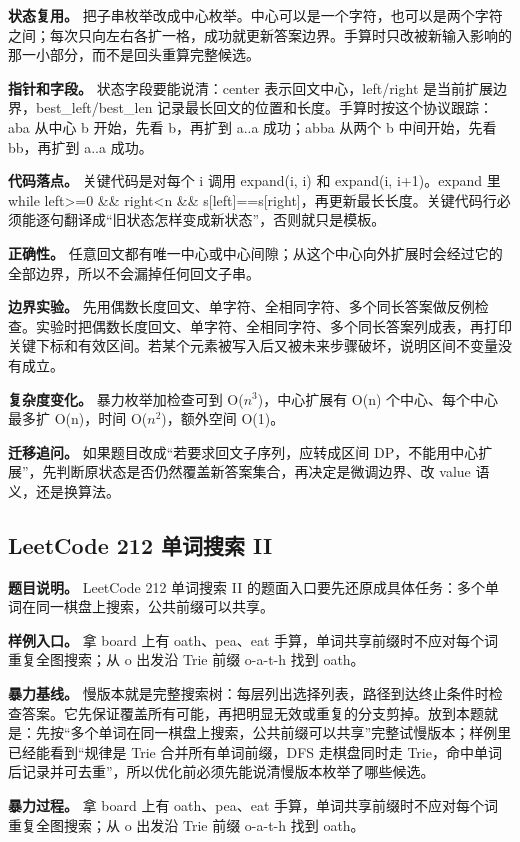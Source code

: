 \textbf{状态复用。} 把子串枚举改成中心枚举。中心可以是一个字符，也可以是两个字符之间；每次只向左右各扩一格，成功就更新答案边界。手算时只改被新输入影响的那一小部分，而不是回头重算完整候选。

\textbf{指针和字段。} 状态字段要能说清：center 表示回文中心，left/right 是当前扩展边界，best\_left/best\_len 记录最长回文的位置和长度。手算时按这个协议跟踪：aba 从中心 b 开始，先看 b，再扩到 a..a 成功；abba 从两个 b 中间开始，先看 bb，再扩到 a..a 成功。

\textbf{代码落点。} 关键代码是对每个 i 调用 expand(i, i) 和 expand(i, i+1)。expand 里 while left>=0 \&\& right<n \&\& s[left]==s[right]，再更新最长长度。关键代码行必须能逐句翻译成“旧状态怎样变成新状态”，否则就只是模板。

\textbf{正确性。} 任意回文都有唯一中心或中心间隙；从这个中心向外扩展时会经过它的全部边界，所以不会漏掉任何回文子串。

\textbf{边界实验。} 先用偶数长度回文、单字符、全相同字符、多个同长答案做反例检查。实验时把偶数长度回文、单字符、全相同字符、多个同长答案列成表，再打印关键下标和有效区间。若某个元素被写入后又被未来步骤破坏，说明区间不变量没有成立。

\textbf{复杂度变化。} 暴力枚举加检查可到 O(\ensuremath{n^{3}})，中心扩展有 O(n) 个中心、每个中心最多扩 O(n)，时间 O(\ensuremath{n^{2}})，额外空间 O(1)。

\textbf{迁移追问。} 如果题目改成“若要求回文子序列，应转成区间 DP，不能用中心扩展”，先判断原状态是否仍然覆盖新答案集合，再决定是微调边界、改 value 语义，还是换算法。

\subsection{LeetCode 212 单词搜索 II}

\textbf{题目说明。} LeetCode 212 单词搜索 II 的题面入口要先还原成具体任务：多个单词在同一棋盘上搜索，公共前缀可以共享。

\textbf{样例入口。} 拿 board 上有 oath、pea、eat 手算，单词共享前缀时不应对每个词重复全图搜索；从 o 出发沿 Trie 前缀 o-a-t-h 找到 oath。

\textbf{暴力基线。} 慢版本就是完整搜索树：每层列出选择列表，路径到达终止条件时检查答案。它先保证覆盖所有可能，再把明显无效或重复的分支剪掉。放到本题就是：先按“多个单词在同一棋盘上搜索，公共前缀可以共享”完整试慢版本；样例里已经能看到“规律是 Trie 合并所有单词前缀，DFS 走棋盘同时走 Trie，命中单词后记录并可去重”，所以优化前必须先能说清慢版本枚举了哪些候选。

\textbf{暴力过程。} 拿 board 上有 oath、pea、eat 手算，单词共享前缀时不应对每个词重复全图搜索；从 o 出发沿 Trie 前缀 o-a-t-h 找到 oath。

